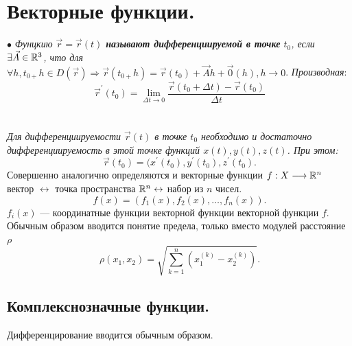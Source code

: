 \section{Векторные функции.}
$\bullet$\textit{ Фунцкию $\vec{r} = \vec{r}(t)$\textbf{ называют дифференциируемой в точке} $t_0$, если $\exists \vec{A} \in \mathbb{R}^3$, что для $\forall h, t_{0+}h \in D(\vec{r}) \Rightarrow \vec{r}(t_{0+}h) = \vec{r}(t_0) + \vec{A}h + \vec{0}(h), h \rightarrow 0$}.
\textit{Производная}: $$\vec{r}^\prime(t_0) = \lim_{\Delta t \rightarrow 0} \frac{\vec{r}(t_0 + \Delta t) - \vec{r}(t_0)}{\Delta t}$$\\\\
\textit{Для дифференциируемости $\vec{r}(t)$ в точке $t_0$ необходимо и достаточно дифференциируемость в этой точке функций $x(t), y(t), z(t)$. При этом:}\\
$$\vec{r}(t_0) = (x^\prime(t_0), y^\prime(t_0), z^\prime(t_0).$$
Совершенно аналогично определяются и векторные функции $f : X \longrightarrow \mathbb{R}^n$\\
вектор $\leftrightarrow$ точка пространства $\mathbb{R}^n \leftrightarrow$ набор из $n$ чисел.\\
$$f(x) = (f_1(x), f_2(x), \dots, f_n(x)).$$
$f_i(x)$ --- координатные функции векторной функции векторной функции $f$.\\
Обычным образом вводится понятие предела, только вместо модулей расстояние $\rho$
$$\rho(x_1, x_2) = \sqrt{\sum_{k = 1}^n(x_1^{(k)} - x_2^{(k)})}.$$
\subsection{Комплекснозначные функции.}
Дифференцирование вводится обычным образом.

